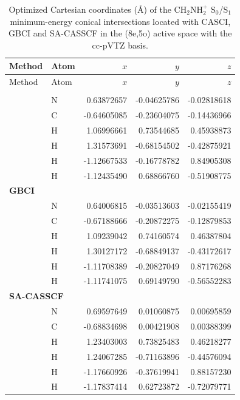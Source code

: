 \begin{longtable}{llrrr}
\caption{Optimized Cartesian coordinates (\AA) of the CH$_2$NH$_2^+$ S$_0$/S$_1$ minimum-energy conical intersections located with CASCI, GBCI and SA-CASSCF in the (8e,5o) active space with the cc-pVTZ basis.}\label{tab:si_ch2nh2_ccpvtz_meci_geometries_5o8e}\\
\hline
Method & Atom & $x$ & $y$ & $z$ \\
\hline
\endfirsthead
\hline
Method & Atom & $x$ & $y$ & $z$ \\
\hline
\endhead
\hline
\endfoot
\multicolumn{5}{l}{\textbf{CASCI}}\\
 & N &  0.63872657 & -0.04625786 & -0.02818618 \\
 & C & -0.64605085 & -0.23604075 & -0.14436966 \\
 & H &  1.06996661 &  0.73544685 &  0.45938873 \\
 & H &  1.31573691 & -0.68154502 & -0.42875921 \\
 & H & -1.12667533 & -0.16778782 &  0.84905308 \\
 & H & -1.12435490 &  0.68866760 & -0.51908775 \\
\multicolumn{5}{l}{\textbf{GBCI}}\\
 & N &  0.64006815 & -0.03513603 & -0.02155419 \\
 & C & -0.67188666 & -0.20872275 & -0.12879853 \\
 & H &  1.09239042 &  0.74160574 &  0.46387804 \\
 & H &  1.30127172 & -0.68849137 & -0.43172617 \\
 & H & -1.11708389 & -0.20827049 &  0.87176268 \\
 & H & -1.11741075 &  0.69149790 & -0.56552283 \\
\multicolumn{5}{l}{\textbf{SA-CASSCF}}\\
 & N &  0.69597649 &  0.01060875 &  0.00695859 \\
 & C & -0.68834698 &  0.00421908 &  0.00388399 \\
 & H &  1.23403003 &  0.73825483 &  0.46218277 \\
 & H &  1.24067285 & -0.71163896 & -0.44576094 \\
 & H & -1.17660926 & -0.37619941 &  0.88157230 \\
 & H & -1.17837414 &  0.62723872 & -0.72079771 \\
\end{longtable}
